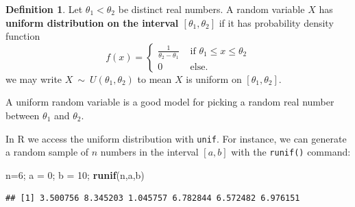 \documentclass[
]{book}
\newenvironment{Shaded}{\begin{snugshade}}{\end{snugshade}}
\newcommand{\DecValTok}[1]{\textcolor[rgb]{0.00,0.00,0.81}{#1}}
\newcommand{\FunctionTok}[1]{\textcolor[rgb]{0.13,0.29,0.53}{\textbf{#1}}}
\newcommand{\NormalTok}[1]{#1}
\newcommand{\OtherTok}[1]{\textcolor[rgb]{0.56,0.35,0.01}{#1}}
\theoremstyle{definition}
\newtheorem{definition}{Definition}[chapter]
\theoremstyle{definition}
\theoremstyle{definition}
\theoremstyle{definition}
\theoremstyle{remark}
\begin{document}
\begin{definition}
\protect\hypertarget{def:uniform-distribution}{}\label{def:uniform-distribution}Let \(\theta_1 < \theta_2\) be distinct real numbers. A random variable \(X\) has \textbf{uniform distribution on the interval \([\theta_1,\theta_2]\)} if it has probability density function
\[
f(x)=
\begin{cases}
\frac{1}{\theta_2 - \theta_1} &\text{ if }\theta_1 \leq x \leq \theta_2 \\
0 &\text{ else.} 
\end{cases}
\]
we may write \(X ~\sim~ U(\theta_1,\theta_2)\) to mean \(X\) is uniform on \([\theta_1,\theta_2]\).
\end{definition}

A uniform random variable is a good model for picking a random real number between \(\theta_1\) and \(\theta_2\).

In R we access the uniform distribution with \texttt{unif}. For instance, we can generate a random sample of \(n\) numbers in the interval \([a,b]\) with the \texttt{runif()} command:

\begin{Shaded}
\begin{Highlighting}[]
\NormalTok{n}\OtherTok{=}\DecValTok{6}\NormalTok{; a }\OtherTok{=} \DecValTok{0}\NormalTok{; b }\OtherTok{=} \DecValTok{10}\NormalTok{;}
\FunctionTok{runif}\NormalTok{(n,a,b)}
\end{Highlighting}
\end{Shaded}

\begin{verbatim}
## [1] 3.500756 8.345203 1.045757 6.782844 6.572482 6.976151
\end{verbatim}
\end{document}
